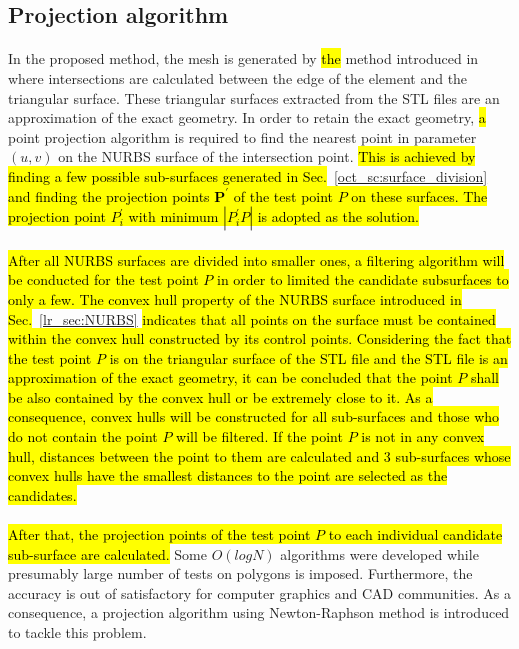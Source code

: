 \subsection{Projection algorithm}
\paragraph{}
In the proposed method, the mesh is generated by \hl{the} method introduced in \cite{Liu2017} where intersections are calculated between the edge of the element and the triangular surface.
These triangular surfaces extracted from the STL files are an approximation of the exact geometry.
In order to retain the exact geometry, \hl{a} point projection algorithm is required to find the nearest point in parameter $(u, v)$ on the NURBS surface of the intersection point.
\hl{This is achieved by finding a few possible sub-surfaces generated in Sec.}~\ref{oct_sc:surface_division} \hl{and finding the projection points $\mathbf{P}^\prime$ of the test point $P$ on these surfaces.
The projection point $P_i^\prime$ with minimum $|P_i^\prime P|$ is adopted as the solution.
}


\paragraph{}
\hl{After all NURBS surfaces are divided into smaller ones, a filtering algorithm will be conducted for the test point $P$ in order to limited the candidate subsurfaces to only a few.
The convex hull property of the NURBS surface introduced in Sec.}~\ref{lr_sec:NURBS} \hl{indicates that all points on the surface must be contained within the convex hull constructed by its control points.
Considering the fact that the test point $P$ is on the triangular surface of the STL file and the STL file is an approximation of the exact geometry, it can be concluded that the point $P$ shall be also contained by the convex hull or be extremely close to it.
As a consequence, convex hulls will be constructed for all sub-surfaces and those who do not contain the point $P$ will be filtered.
If the point $P$ is not in any convex hull, distances between the point to them are calculated and 3 sub-surfaces whose convex hulls have the smallest distances to the point are selected as the candidates.}

\paragraph{}
\hl{After that, the projection points of the test point $P$ to each individual candidate sub-surface are calculated.}
Some $O(logN)$ algorithms were developed \citep{Edelsbrunner:1985:CED:4007.4011, Chin1983OptimalAF} while presumably large number of tests on polygons is imposed.
Furthermore, the accuracy is out of satisfactory for computer graphics and CAD communities.
As a consequence, a projection algorithm \citep{MA200379} using Newton-Raphson method is introduced to tackle this problem.

